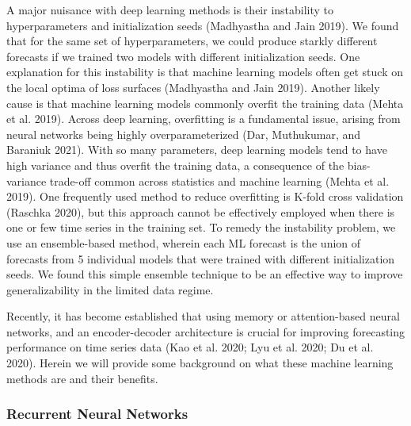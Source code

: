 \documentclass{article}
\begin{document}
A major nuisance with deep learning methods is their instability to
hyperparameters and initialization seeds (Madhyastha and Jain 2019). We
found that for the same set of hyperparameters, we could produce starkly
different forecasts if we trained two models with different
initialization seeds. One explanation for this instability is that
machine learning models often get stuck on the local optima of loss
surfaces (Madhyastha and Jain 2019). Another likely cause is that
machine learning models commonly overfit the training data (Mehta et al.
2019). Across deep learning, overfitting is a fundamental issue, arising
from neural networks being highly overparameterized (Dar, Muthukumar,
and Baraniuk 2021). With so many parameters, deep learning models tend
to have high variance and thus overfit the training data, a consequence
of the bias-variance trade-off common across statistics and machine
learning (Mehta et al. 2019). One frequently used method to reduce
overfitting is K-fold cross validation (Raschka 2020), but this approach
cannot be effectively employed when there is one or few time series in
the training set. To remedy the instability problem, we use an
ensemble-based method, wherein each ML forecast is the union of
forecasts from 5 individual models that were trained with different
initialization seeds. We found this simple ensemble technique to be an
effective way to improve generalizability in the limited data regime.

Recently, it has become established that using memory or attention-based
neural networks, and an encoder-decoder architecture is crucial for
improving forecasting performance on time series data (Kao et al. 2020;
Lyu et al. 2020; Du et al. 2020). Herein we will provide some background
on what these machine learning methods are and their benefits.

\hypertarget{recurrent-neural-networks}{%
\subsubsection{Recurrent Neural
Networks}\label{recurrent-neural-networks}}
\end{document}
